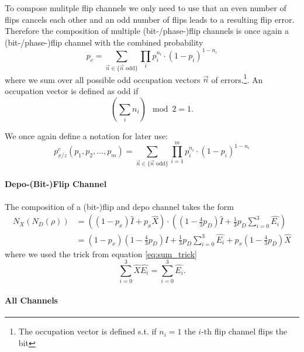 To compose mulitple flip channels we only need to use that an even number of flips cancels each other and an odd number of flips leads to a resulting flip error.
Therefore the composition of multiple (bit-/phase-)flip channels is once again a (bit-/phase-)flip channel with the combined probability
\begin{equation*}
    p_c = \sum_{\vec{n}\in\{\vec{n} \text{ odd}\}} \prod_i p_i^{n_i} \cdot \left( 1-p_i\right)^{1-n_i}
\end{equation*}
where we sum over all possible odd occupation vectors $\vec{n}$ of errors.\footnote{The occupation vector is defined s.t. if $n_i = 1$ the $i$-th flip channel flips the bit}.
An occupation vector is defined as odd if 
\begin{equation*}
    \left(\sum_i n_i\right) \mod 2 = 1.
\end{equation*}

We once again define a notation for later use:
\begin{equation}
    p_{x/z}^c(p_1,p_2,...,p_m) = \sum_{\vec{n}\in\{\vec{n} \text{ odd}\}} \prod_{i=1}^m p_i^{n_i} \cdot \left( 1-p_i\right)^{1-n_i}
    \label{eq:composition_fli_flip}
\end{equation}



\paragraph{Depo-(Bit-)Flip Channel}

The composition of a (bit-)flip and depo channel takes the form
\begin{align*}
    N_{X}(N_{D}(\rho)) &= \left( (1-p_x) \hat{I} + p_x \hat{X}\right)
    \cdot \left( \left(1-\frac{4}{3}p_D\right) \hat{I} + \frac{1}{3} p_D \sum_{i=0}^{3}\hat{E_i} \right) \\
    &= (1-p_x)\left(1-\frac{4}{3}p_D\right) \hat{I} + \frac{1}{3} p_D \sum_{i=0}^{3}\hat{E_i}  + p_x\left(1-\frac{4}{3}p_D\right) \hat{X}
\end{align*}
where we used the trick from equation \ref{eq:sum_trick}
\begin{equation*}
    \sum_{i=0}^{3} \hat{X}\hat{E_i} = 
    \sum_{i=0}^{3} \hat{E_i}. 
\end{equation*}


\paragraph{All Channels}

